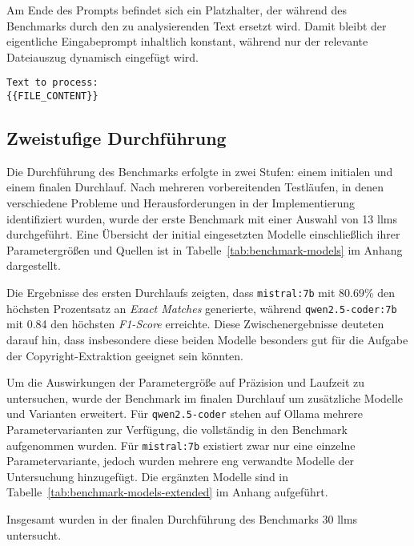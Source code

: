 Am Ende des Prompts befindet sich ein Platzhalter, der während des Benchmarks durch den zu analysierenden Text ersetzt wird.
Damit bleibt der eigentliche Eingabeprompt inhaltlich konstant, während nur der relevante Dateiauszug dynamisch eingefügt wird.

\begin{lstlisting}[keepspaces=true]
Text to process:
{{FILE_CONTENT}}
\end{lstlisting}


\subsection{Zweistufige Durchführung}

Die Durchführung des Benchmarks erfolgte in zwei Stufen: einem initialen und einem finalen Durchlauf.
Nach mehreren vorbereitenden Testläufen, in denen verschiedene Probleme und Herausforderungen in der Implementierung identifiziert wurden, wurde der erste Benchmark mit einer Auswahl von \num{13} \glspl{llm} durchgeführt.
Eine Übersicht der initial eingesetzten Modelle einschließlich ihrer Parametergrößen und Quellen ist in Tabelle~\ref{tab:benchmark-models} im Anhang dargestellt.

Die Ergebnisse des ersten Durchlaufs zeigten, dass \texttt{mistral:7b} mit \num{80.69}\% den höchsten Prozentsatz an \textit{Exact Matches} generierte, während \texttt{qwen2.5-coder:7b} mit \num{0.84} den höchsten \textit{F1-Score} erreichte.
Diese Zwischenergebnisse deuteten darauf hin, dass insbesondere diese beiden Modelle besonders gut für die Aufgabe der Copyright-Extraktion geeignet sein könnten.

Um die Auswirkungen der Parametergröße auf Präzision und Laufzeit zu untersuchen, wurde der Benchmark im finalen Durchlauf um zusätzliche Modelle und Varianten erweitert.
Für \texttt{qwen2.5-coder} stehen auf Ollama mehrere Parametervarianten zur Verfügung, die vollständig in den Benchmark aufgenommen wurden.
Für \texttt{mistral:7b} existiert zwar nur eine einzelne Parametervariante, jedoch wurden mehrere eng verwandte Modelle der Untersuchung hinzugefügt.
Die ergänzten Modelle sind in Tabelle~\ref{tab:benchmark-models-extended} im Anhang aufgeführt.

Insgesamt wurden in der finalen Durchführung des Benchmarks \num{30} \glspl{llm} untersucht.

